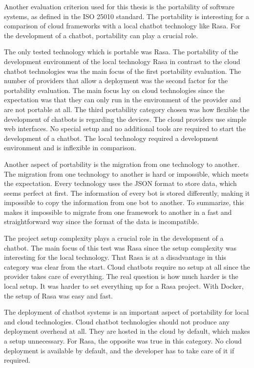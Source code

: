 Another evaluation criterion used for this thesis is the portability of software systems, as defined in the ISO 25010\cite{iso25010} standard.
The portability is interesting for a comparison of cloud frameworks with a  local chatbot technology like Rasa.
For the development of a chatbot, portability can play a crucial role.

The only tested technology which is portable was Rasa. 
The portability of the development environment of the local technology Rasa in contrast to the cloud chatbot technologies was the main focus of the first portability evaluation.
The number of providers that allow a deployment was the second factor for the portability evaluation.
The main focus lay on cloud technologies since the expectation was
that they can only run in the environment of the provider and are 
not portable at all.
The third portability category chosen was how flexible the development
of chatbots is regarding the devices.
The cloud providers use simple web interfaces.
No special setup and no additional tools are required to start the development of a chatbot.
The local technology required a development environment and is inflexible in comparison.

Another aspect of portability is the migration from one technology to another.
The migration from one technology to another is hard or impossible, which meets the expectation.
Every technology uses the JSON format to store data, which seems perfect at first.
The information of every bot is stored differently, making it impossible to copy the information from one bot to another.
To summarize, this makes it impossible to migrate from one framework to another in a fast and straightforward way since the format of the data is incompatible. 

The project setup complexity plays a crucial role in the development of a chatbot.
The main focus of this test was Rasa since the setup complexity was interesting for the local technology.
That Rasa is at a disadvantage in this category was clear from the start.
Cloud chatbots require no setup at all since the provider takes care of everything.
The real question is how much harder is the local setup.
It was harder to set everything up for a Rasa project.
With Docker, the setup of Rasa was easy and fast.  

The deployment of chatbot systems is an important aspect of portability for local and cloud technologies.
Cloud chatbot technologies should not produce any deployment overhead at all.
They are hosted in the cloud by default, which makes a setup unnecessary.
For Rasa, the opposite was true in this category.
No cloud deployment is available by default, and the developer has to take care of it if required.

